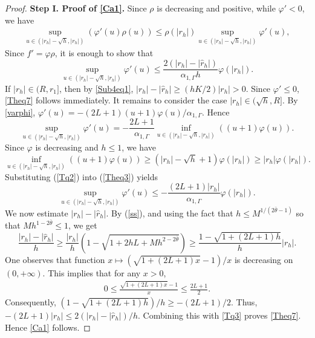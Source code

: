 \documentclass[aap]{imsart}
\theoremstyle{plain}
\theoremstyle{definition}
\begin{document}
\begin{proof}
{\bf Step I. Proof of \eqref{Ca1}.}
Since $\rho$ is decreasing and positive, while $\varphi'<0$, we have
\begin{align*}
\sup_{u\in(|r_h|-\sqrt{h}, |r_h|)}(\varphi'(u)\rho(u)) \leqslant  \rho(|r_h|)\sup_{u\in(|r_h|-\sqrt{h}, |r_h|)}\varphi'(u),
\end{align*}
Since $f'=\varphi\rho$, it is enough to show that
\begin{equation}\label{Theq7}
\sup_{u\in(|r_h|-\sqrt{h}, |r_h|)}\varphi'(u)\leqslant \frac{2(|r_h|-|\hat{r}_h|)}{\alpha_{1, \Gamma} h}\varphi(|r_h|).
\end{equation}
If $|r_h|\in(R, r_1]$, then by \eqref{Sub4eq1}, $|r_h|-|\hat{r}_h|\geqslant (hK/2)|r_h|>0$. Since $\varphi'\leqslant 0$, \eqref{Theq7} follows immediately. It remains to consider the case $|r_h|\in(\sqrt h,R]$. By \eqref{varphi}, \(\varphi'(u)
=
-(2L+1)(u+1)\varphi(u)/\alpha_{1,\Gamma}\). Hence
\begin{equation}\label{Theq3}
\sup_{u\in(|r_h|-\sqrt{h}, |r_h|)}\varphi'(u)
=-\frac{2L+1}{\alpha_{1, \Gamma}}\inf_{u\in(|r_h|-\sqrt{h}, |r_h|)}\left((u+1) \varphi(u)\right).
\end{equation}
Since $\varphi$ is decreasing and $h\leqslant 1$, we have
\begin{equation}\label{Tq2}
\inf_{u\in(|r_h|-\sqrt{h}, |r_h|)}\left((u+1) \varphi(u)\right)\geqslant(|r_h|-\sqrt{h}+1)\varphi(|r_h|)\geqslant |r_h|\varphi(|r_h|).	   
\end{equation}
Substituting (\ref{Tq2}) into (\ref{Theq3}) yields 
\begin{equation}\label{Tq3}
\sup_{u\in(|r_h|-\sqrt{h}, |r_h|)}\varphi'(u)\leqslant -\frac{(2L+1)|r_h|}{\alpha_{1, \Gamma}}\varphi(|r_h|).
\end{equation}
We now estimate $|r_h|-|\hat r_h|$.	
By (\ref{ss}), and using the fact that \(h\leqslant M^{1/(2\bar\theta-1)}\) so that \(Mh^{1-2\bar{\theta}}\leqslant 1\), we get 
\begin{equation*}	
\frac{|r_h|-|\hat{r}_h|}{h}\geqslant \frac{|r_h|}{h}\left(1-\sqrt{1+2hL+Mh^{2-2\bar{\theta}}}\right)\geqslant \frac{1-\sqrt{1+(2L+1)h}}{h}|r_h|.
\end{equation*}		     
One observes that function $x\mapsto (\sqrt{1+(2L+1) x}-1)/x$ is decreasing on $(0, +\infty)$. This implies that for any $x>0$,
\begin{align*}
0\leqslant \frac{\sqrt{1+(2L+1)x}-1}{x}\leqslant \frac{2L+1}{2}.
\end{align*}
Consequently, \((1-\sqrt{1+(2L+1)h})/h \geqslant -(2L+1)/2\). Thus, \(-(2L+1)|r_h|\leqslant 2(|r_h|-|\hat r_h|)/h\).
Combining this with \eqref{Tq3} proves \eqref{Theq7}. Hence
\eqref{Ca1} follows.
				

\end{proof}
\end{document}
